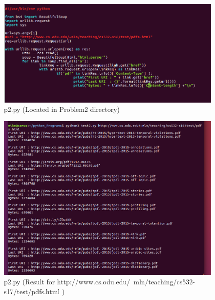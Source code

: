 \documentclass{article}
\begin{document}
\begin{figure}[ht!]
\centering
\includegraphics[width=\linewidth]{p2_code.png}
\caption{p2.py (Located in Problem2 directory) \label{overflow}}
\end{figure}

\begin{figure}[ht!]
\centering
\includegraphics[width=\linewidth]{p2_result.png}
\caption{p2.py (Result for http://www.cs.odu.edu/~mln/teaching/cs532-s17/test/pdfs.html ) \label{overflow}}
\end{figure}
\end{document}
